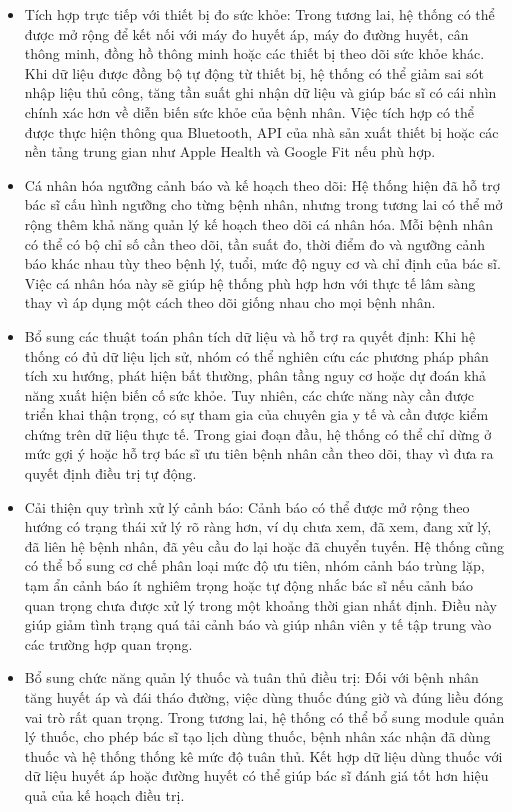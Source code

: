 \begin{itemize}
    \item Tích hợp trực tiếp với thiết bị đo sức khỏe: Trong tương lai, hệ thống có thể được mở rộng để kết nối với máy đo huyết áp, máy đo đường huyết, cân thông minh, đồng hồ thông minh hoặc các thiết bị theo dõi sức khỏe khác. Khi dữ liệu được đồng bộ tự động từ thiết bị, hệ thống có thể giảm sai sót nhập liệu thủ công, tăng tần suất ghi nhận dữ liệu và giúp bác sĩ có cái nhìn chính xác hơn về diễn biến sức khỏe của bệnh nhân. Việc tích hợp có thể được thực hiện thông qua Bluetooth, API của nhà sản xuất thiết bị hoặc các nền tảng trung gian như Apple Health và Google Fit nếu phù hợp.

    \item Cá nhân hóa ngưỡng cảnh báo và kế hoạch theo dõi: Hệ thống hiện đã hỗ trợ bác sĩ cấu hình ngưỡng cho từng bệnh nhân, nhưng trong tương lai có thể mở rộng thêm khả năng quản lý kế hoạch theo dõi cá nhân hóa. Mỗi bệnh nhân có thể có bộ chỉ số cần theo dõi, tần suất đo, thời điểm đo và ngưỡng cảnh báo khác nhau tùy theo bệnh lý, tuổi, mức độ nguy cơ và chỉ định của bác sĩ. Việc cá nhân hóa này sẽ giúp hệ thống phù hợp hơn với thực tế lâm sàng thay vì áp dụng một cách theo dõi giống nhau cho mọi bệnh nhân.

    \item Bổ sung các thuật toán phân tích dữ liệu và hỗ trợ ra quyết định: Khi hệ thống có đủ dữ liệu lịch sử, nhóm có thể nghiên cứu các phương pháp phân tích xu hướng, phát hiện bất thường, phân tầng nguy cơ hoặc dự đoán khả năng xuất hiện biến cố sức khỏe. Tuy nhiên, các chức năng này cần được triển khai thận trọng, có sự tham gia của chuyên gia y tế và cần được kiểm chứng trên dữ liệu thực tế. Trong giai đoạn đầu, hệ thống có thể chỉ dừng ở mức gợi ý hoặc hỗ trợ bác sĩ ưu tiên bệnh nhân cần theo dõi, thay vì đưa ra quyết định điều trị tự động.

    \item Cải thiện quy trình xử lý cảnh báo: Cảnh báo có thể được mở rộng theo hướng có trạng thái xử lý rõ ràng hơn, ví dụ chưa xem, đã xem, đang xử lý, đã liên hệ bệnh nhân, đã yêu cầu đo lại hoặc đã chuyển tuyến. Hệ thống cũng có thể bổ sung cơ chế phân loại mức độ ưu tiên, nhóm cảnh báo trùng lặp, tạm ẩn cảnh báo ít nghiêm trọng hoặc tự động nhắc bác sĩ nếu cảnh báo quan trọng chưa được xử lý trong một khoảng thời gian nhất định. Điều này giúp giảm tình trạng quá tải cảnh báo và giúp nhân viên y tế tập trung vào các trường hợp quan trọng.

    \item Bổ sung chức năng quản lý thuốc và tuân thủ điều trị: Đối với bệnh nhân tăng huyết áp và đái tháo đường, việc dùng thuốc đúng giờ và đúng liều đóng vai trò rất quan trọng. Trong tương lai, hệ thống có thể bổ sung module quản lý thuốc, cho phép bác sĩ tạo lịch dùng thuốc, bệnh nhân xác nhận đã dùng thuốc và hệ thống thống kê mức độ tuân thủ. Kết hợp dữ liệu dùng thuốc với dữ liệu huyết áp hoặc đường huyết có thể giúp bác sĩ đánh giá tốt hơn hiệu quả của kế hoạch điều trị.


\end{itemize}
